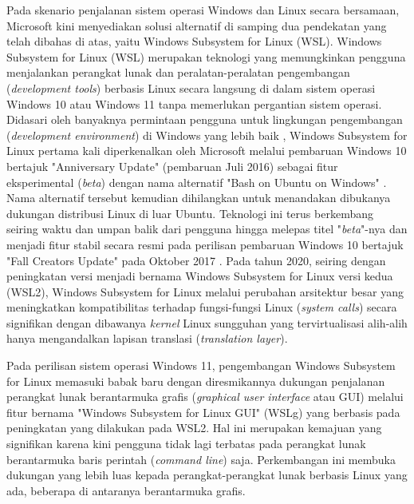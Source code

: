 Pada skenario penjalanan sistem operasi Windows dan Linux secara bersamaan, Microsoft kini menyediakan solusi alternatif di samping dua pendekatan yang telah dibahas di atas, yaitu Windows Subsystem for Linux (WSL). Windows Subsystem for Linux (WSL) merupakan teknologi yang memungkinkan pengguna menjalankan perangkat lunak dan peralatan-peralatan pengembangan (\textit{development tools}) berbasis Linux secara langsung di dalam sistem operasi Windows 10 atau Windows 11 tanpa memerlukan pergantian sistem operasi. Didasari oleh banyaknya permintaan pengguna untuk lingkungan pengembangan (\textit{development environment}) di Windows yang lebih baik \cite{some-background-on-why-bouow-was-planned}, Windows Subsystem for Linux pertama kali diperkenalkan oleh Microsoft melalui pembaruan Windows 10 bertajuk "Anniversary Update" (pembaruan Juli 2016) sebagai fitur eksperimental (\textit{beta}) dengan nama alternatif "Bash on Ubuntu on Windows" \cite{bouow-release-article}. Nama alternatif tersebut kemudian dihilangkan untuk menandakan dibukanya dukungan distribusi Linux di luar Ubuntu. Teknologi ini terus berkembang seiring waktu dan umpan balik dari pengguna hingga melepas titel "\textit{beta}"-nya dan menjadi fitur stabil secara resmi pada perilisan pembaruan Windows 10 bertajuk "Fall Creators Update" pada Oktober 2017 \cite{omgubuntu-wsl-exits-beta}. Pada tahun 2020, seiring dengan peningkatan versi menjadi bernama Windows Subsystem for Linux versi kedua (WSL2), Windows Subsystem for Linux melalui perubahan arsitektur besar yang meningkatkan kompatibilitas terhadap fungsi-fungsi Linux (\textit{system calls}) secara signifikan dengan dibawanya \textit{kernel} Linux sungguhan yang tervirtualisasi alih-alih hanya mengandalkan lapisan translasi (\textit{translation layer}).

Pada perilisan sistem operasi Windows 11, pengembangan Windows Subsystem for Linux memasuki babak baru dengan diresmikannya dukungan penjalanan perangkat lunak berantarmuka grafis (\textit{graphical user interface} atau GUI) melalui fitur bernama "Windows Subsystem for Linux GUI" (WSLg) yang berbasis pada peningkatan yang dilakukan pada WSL2. Hal ini merupakan kemajuan yang signifikan karena kini pengguna tidak lagi terbatas pada perangkat lunak berantarmuka baris perintah (\textit{command line}) saja. Perkembangan ini membuka dukungan yang lebih luas kepada perangkat-perangkat lunak berbasis Linux yang ada, beberapa di antaranya berantarmuka grafis.


